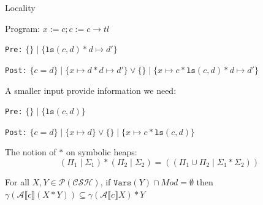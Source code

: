 \documentclass[aspectratio=1610, 13pt]{beamer}
\begin{document}
\begin{frame}{Locality}
    \begin{example}
    Program: $x:=c;c:=c\rightarrow tl$
    
    \texttt{Pre:} $\{\}\mid \{\texttt{ls}(c,d)*d\mapsto d'\}$

    \texttt{Post:} $\{c=d\}\mid \{x\mapsto d *d\mapsto d'\} \vee \{\}\mid \{x\mapsto c* \texttt{ls}(c,d) *d\mapsto d'\}$  
    
    A smaller input provide information we need:
    
    \texttt{Pre:} $\{\}\mid \{\texttt{ls}(c,d)\}$

    \texttt{Post:} $\{c=d\}\mid \{x\mapsto d \} \vee \{\}\mid \{x\mapsto c* \texttt{ls}(c,d) \}$  
    \end{example}
    
    The notion of $*$ on symbolic heaps:
    \[(\Pi_1\mid \Sigma_1) *(\Pi_2\mid \Sigma_2) = ((\Pi_1\cup \Pi_2\mid \Sigma_1*\Sigma_2))\]
    
    \begin{theorem}
    For all $X,Y\in \mathcal{P(CSH)}$, if $\texttt{Vars}(Y) \cap Mod = \emptyset$ then $\gamma(\mathcal{A}\llbracket c\rrbracket(X*Y)) \subseteq \gamma(\mathcal{A}\llbracket c\rrbracket X)*Y$
    \end{theorem}
\end{frame}
\end{document}
